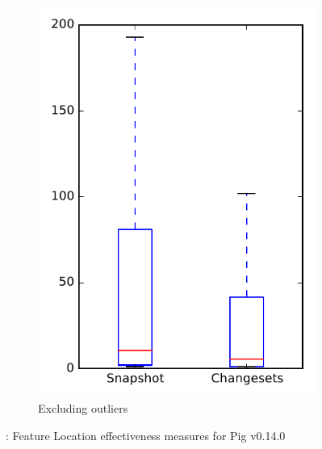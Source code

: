 \begin{figure}
\begin{subfigure}{.4\textwidth}
        \includegraphics[height=0.4\textheight]{figures/flt/rq1_pig_no_outlier}
        \caption{Excluding outliers}\label{fig:flt:rq1:pig_no_outlier}
    \end{subfigure}
\caption{\fone: Feature Location effectiveness measures for Pig v0.14.0}
\label{fig:flt:rq1:pig}
\end{figure}
